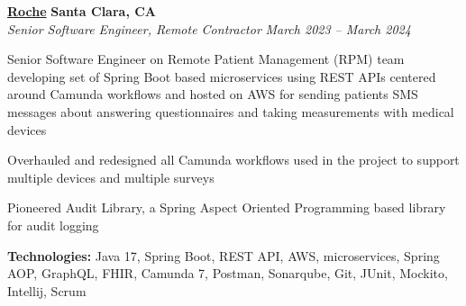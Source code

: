 %
    \headerrow
        {\textbf{\href{https://www.roche.com/}{Roche}}}
        {\textbf{Santa Clara, CA}}
    \\
    \headerrow
        {\emph{Senior Software Engineer, Remote Contractor}}
        {\emph{March 2023 -- March 2024}}
    \begin{itemize*}
        \item Senior Software Engineer on Remote Patient Management (RPM) team developing set of Spring Boot based microservices using REST APIs centered around Camunda workflows and hosted on AWS for sending patients SMS messages about answering questionnaires and taking measurements with medical devices
        \item Overhauled and redesigned all Camunda workflows used in the project to support multiple devices and multiple surveys
        \item Pioneered Audit Library, a Spring Aspect Oriented Programming based library for audit logging
    \end{itemize*}

    \hspace{1.0em}
        {\textbf{Technologies:} Java 17, Spring Boot, REST API, AWS, microservices, Spring AOP, GraphQL, FHIR, Camunda 7, Postman, Sonarqube, Git, JUnit, Mockito, Intellij, Scrum}

